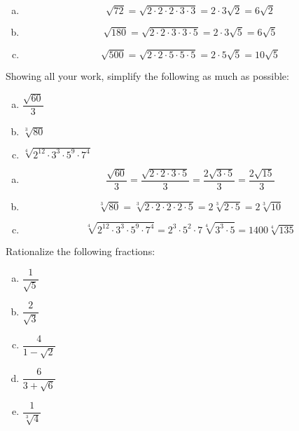 \documentclass[11pt,letterpaper]{article}
\begin{document}
\sol
\begin{enumerate}[(a)]
\item 
	\[
	\sqrt{72}= \sqrt{2 \cdot 2 \cdot 2 \cdot 3 \cdot 3}= 2 \cdot 3 \sqrt{2}= 6 \sqrt{2}
	\] \pspace

\item 
	\[
	\sqrt{180}= \sqrt{2 \cdot 2 \cdot 3 \cdot 3 \cdot 5}= 2 \cdot 3 \sqrt{5}= 6 \sqrt{5}
	\] \pspace

\item 
	\[
	\sqrt{500}= \sqrt{2 \cdot 2 \cdot 5 \cdot 5 \cdot 5}= 2 \cdot 5 \sqrt{5}= 10 \sqrt{5}
	\]
\end{enumerate}



\newpage



 Showing all your work, simplify the following as much as possible:
        \begin{enumerate}[(a)]
        \item $\dfrac{\sqrt{60}}{3}$
        \item $\sqrt[3]{80}$
        \item $\sqrt[4]{2^{12} \cdot 3^3 \cdot 5^9 \cdot 7^4}$
        \end{enumerate} \pspace

\sol
\begin{enumerate}[(a)]
\item 
	\[
	\dfrac{\sqrt{60}}{3}= \dfrac{\sqrt{2 \cdot 2 \cdot 3 \cdot 5}}{3}= \dfrac{2 \sqrt{3 \cdot 5}}{3}= \dfrac{2 \sqrt{15}}{3}
	\] \pspace

\item 
	\[
	\sqrt[3]{80}= \sqrt[3]{2 \cdot 2 \cdot 2 \cdot 2 \cdot 5}= 2 \sqrt[3]{2 \cdot 5}= 2 \sqrt[3]{10}
	\] \pspace

\item 
	\[
	\sqrt[4]{2^{12} \cdot 3^3 \cdot 5^9 \cdot 7^4}= 2^3 \cdot 5^2 \cdot 7 \sqrt[4]{3^3 \cdot 5}= 1400 \sqrt[4]{135}
	\]
\end{enumerate}



\newpage



 Rationalize the following fractions:
        \begin{enumerate}[(a)]
        \item $\dfrac{1}{\sqrt{5}}$
        \item $\dfrac{2}{\sqrt{3}}$
        \item $\dfrac{4}{1 - \sqrt{2}}$
        \item $\dfrac{6}{3 + \sqrt{6}}$
        \item $\dfrac{1}{\sqrt[3]{4}}$
        \end{enumerate} \pspace
\end{document}
